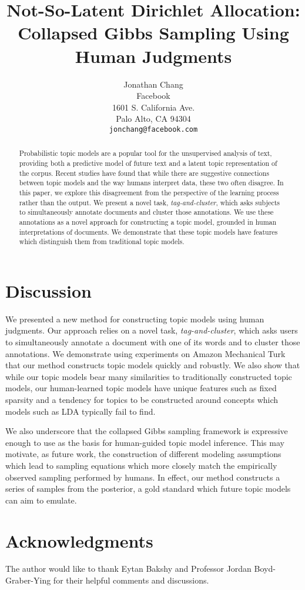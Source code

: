 \documentclass[11pt,letterpaper]{article}
\title{\vspace{-0.4in}Not-So-Latent Dirichlet Allocation: \\ 
       Collapsed Gibbs Sampling Using Human Judgments}
\author{Jonathan Chang \\ 
        Facebook \\ 
        1601 S. California Ave. \\ 
        Palo Alto, CA 94304 \\ 
        \texttt{jonchang@facebook.com}}
\begin{document}
\maketitle
\vspace{-.1in}
\begin{abstract}%
  Probabilistic topic models are a popular tool for the unsupervised
  analysis of text, providing both a predictive model of future text
  and a latent topic representation of the corpus.  Recent studies
  have found that while there are suggestive connections between topic
  models and the way humans interpret data, these two often disagree.
  In this paper, we explore this disagreement from the perspective of
  the learning process rather than the output.  We present a novel
  task, \emph{tag-and-cluster}, which asks subjects to simultaneously
  annotate documents and cluster those annotations.  We use these
  annotations as a novel approach for constructing a topic model,
  grounded in human interpretations of documents.  We demonstrate that
  these topic models have features which distinguish them from
  traditional topic models.
\end{abstract}





\section{Discussion}
We presented a new method for constructing topic models using human
judgments.  Our approach relies on a novel task,
\emph{tag-and-cluster}, which asks users to simultaneously annotate a
document with one of its words and to cluster those annotations.  We
demonstrate using experiments on Amazon Mechanical Turk that our
method constructs topic models quickly and robustly.  We also show
that while our topic models bear many similarities to traditionally
constructed topic models, our human-learned topic models have unique
features such as fixed sparsity and a tendency for topics to be constructed
around concepts which models such as LDA typically fail to find.

  We also underscore that the collapsed Gibbs sampling framework is
  expressive enough to use as the basis for human-guided topic model
  inference.  This may motivate, as future work, the construction of
  different modeling assumptions which lead to sampling equations
  which more closely match the empirically observed sampling performed
  by humans.  In effect, our method constructs a series of samples
  from the posterior, a gold standard which future topic models can
  aim to emulate.
\section*{Acknowledgments}
The author would like to thank Eytan Bakshy and Professor Jordan
Boyd-Graber-Ying for their helpful comments and discussions.


{\footnotesize

}
\end{document}
